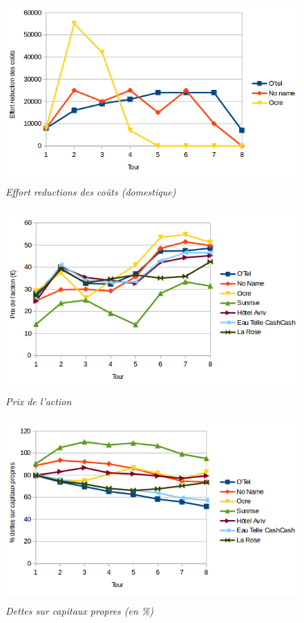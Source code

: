 \documentclass[a4paper,10pt]{article}
\begin{document}
    
    \begin{figure}[!ht]
      \begin{center}
	\includegraphics[height=7cm,keepaspectratio]{./images/effort_reduction_couts.png}
      \end{center}
      \caption{\textit{Effort reductions des coûts (domestique)}}
    \end{figure}
    
    \begin{figure}[!ht]
      \begin{center}
	\includegraphics[height=7cm,keepaspectratio]{./images/action.png}
      \end{center}
      \caption{\textit{Prix de l'action}}
    \end{figure}
        
    \begin{figure}[!ht]
      \begin{center}
	\includegraphics[height=7.0cm,keepaspectratio]{./images/dettes_capitaux.png}
      \end{center}
      \caption{\textit{Dettes sur capitaux propres (en \%)}}
    \end{figure}
    
\end{document}
